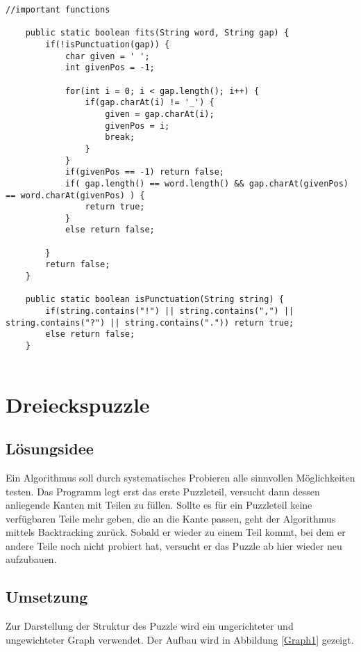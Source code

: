 \documentclass[a4paper, 12pt]{scrartcl}
\begin{document}
\begin{lstlisting}[H]
//important functions

    public static boolean fits(String word, String gap) {
    	if(!isPunctuation(gap)) {
	    	char given = ' ';
	    	int givenPos = -1;
	    	
	    	for(int i = 0; i < gap.length(); i++) {
	    		if(gap.charAt(i) != '_') {
	    			given = gap.charAt(i);
	    			givenPos = i;
	    			break;
	    		}
	    	}
	    	if(givenPos == -1) return false;
	    	if( gap.length() == word.length() && gap.charAt(givenPos) == word.charAt(givenPos) ) {
	    		return true;
	    	}
	    	else return false;
	    	
        }
    	return false;
    }

    public static boolean isPunctuation(String string) {
    	if(string.contains("!") || string.contains(",") || string.contains("?") || string.contains(".")) return true;
    	else return false;
    }
    
\end{lstlisting}

\section{Dreieckspuzzle}
\subsection{Lösungsidee}

Ein Algorithmus soll durch systematisches Probieren alle sinnvollen Möglichkeiten testen. Das Programm legt erst das erste Puzzleteil, versucht dann dessen anliegende Kanten mit Teilen zu füllen. Sollte es für ein Puzzleteil keine verfügbaren Teile mehr geben, die an die Kante passen, geht der Algorithmus mittels Backtracking zurück. Sobald er wieder zu einem Teil kommt, bei dem er andere Teile noch nicht probiert hat, versucht er das Puzzle ab hier wieder neu aufzubauen.

\subsection{Umsetzung}

Zur Darstellung der Struktur des Puzzle wird ein ungerichteter und ungewichteter Graph verwendet. Der Aufbau wird in Abbildung \ref{Graph1} gezeigt.
\end{document}
